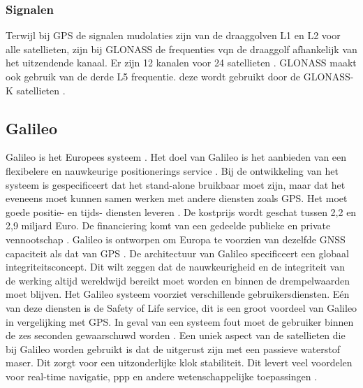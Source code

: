 \subsubsection{Signalen}
Terwijl bij GPS de signalen mudolaties zijn van de draaggolven L1 en L2 voor alle satellieten, zijn bij GLONASS de frequenties vqn de draaggolf afhankelijk van het uitzendende kanaal. Er zijn 12 kanalen voor 24 satellieten \cite{LBibGPS3}. GLONASS maakt ook gebruik van de derde L5 frequentie. deze wordt gebruikt door de GLONASS-K satellieten \cite{LBibGNSS9}.  
 
\subsection{Galileo}
\label{LGal}
Galileo is het Europees systeem \cite{LBibGNSS3, LBibGNSS4}. Het doel van Galileo is het aanbieden van een flexibelere en nauwkeurige positionerings service \cite{LBibGNSS4}. Bij de ontwikkeling van het systeem is gespecificeert dat het stand-alone bruikbaar moet zijn, maar dat het eveneens moet kunnen samen werken met andere diensten zoals GPS. Het moet goede positie- en tijds- diensten leveren \cite{LBibGalileo2}. De kostprijs wordt geschat tussen 2,2 en 2,9 miljard Euro. De financiering komt van een gedeelde publieke en private vennootschap \cite{LBibGNSS8}. Galileo is ontworpen om Europa te voorzien van dezelfde GNSS capaciteit als dat van GPS \cite{LBibGNSS6}. De architectuur van Galileo specificeert een globaal integriteitsconcept. Dit wilt zeggen dat de nauwkeurigheid en de integriteit van de werking altijd wereldwijd bereikt moet worden en binnen de drempelwaarden moet blijven.  Het Galileo systeem voorziet verschillende gebruikersdiensten. E\'en van deze diensten is de Safety of Life service, dit is een groot voordeel van Galileo in vergelijking met GPS. In geval van een systeem fout moet de gebruiker binnen de zes seconden gewaarschuwd worden \cite{LBibGalileo}. Een uniek aspect van de satellieten die bij Galileo worden gebruikt is dat de uitgerust zijn met een passieve waterstof maser. Dit zorgt voor een uitzonderlijke klok stabiliteit. Dit levert veel voordelen voor real-time navigatie, ppp en andere wetenschappelijke toepassingen \cite{LBibGNSS9}.

